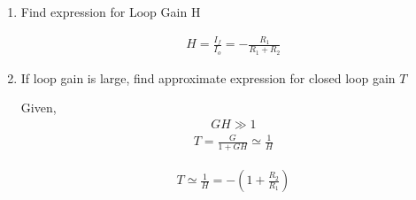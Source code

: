 \begin{enumerate}[label=\thesubsection.\arabic*.,ref=\thesubsection.\theenumi]
\begin{align}
    R_{i}=R_{s}\|R_{i d}\|(R_{1}+R_{2})
\end{align}
\begin{align}
    V_{i}=I_{i} R_{i}
\end{align}
\begin{align}
    I_{o}=-\mu V_{i} \frac{1}{1 / g_{m}+(R_{1}\|R_{2}\| r_{o 2})} \frac{r_{o 2}}{r_{o 2}+(R_{1} \| R_{2})}
\end{align}
\begin{align}
    G = \frac{I_{o}}{I_{i}}=-\mu \frac{R_{i}}{1 / g_{m}+(R_{1}\|R_{2}\| r_{o 2})} \frac{r_{o 2}}{r_{o 2}+(R_{1} \| R_{2})}
\end{align}
We use the approximation
\begin{align}
    1 / g_{m} \ll (R_{1}\|R_{2}\| r_{o 2})
\end{align}
This is because the $\frac{1}{g_{m}}$ is in order of few \ohm s but, $R_{1}$, $R_{2}$ and $r_{o2}$ are in order of k\ohm s 

\begin{align}
    G =-\mu \frac{R_{i}}{R_{1} \| R_{2}}
\end{align}
\begin{align}
    R_{o}=r_{o 2}+(R_{1} \| R_{2})+(g_{m} r_{o 2})(R_{1} \| R_{2})
\end{align}
\begin{align}
    \implies R_{o} \simeq g_{m} r_{o 2}\left(R_{1} \| R_{2}\right)
\end{align}

\item
Find expression for Loop Gain H

\solution
\begin{align}
    H = \frac{I_{f}}{I_{o}}=-\frac{R_{1}}{R_{1}+R_{2}}
\end{align}

\item
If loop gain is large, find approximate expression for closed loop gain $T$

\solution
Given,
\begin{align}
    GH \gg 1
\end{align}
\begin{align}
    T = \frac{G}{1+GH}\simeq \frac{1}{H}
\end{align}


\begin{align}
    T \simeq \frac{1}{H}=-\left(1+\frac{R_{2}}{R_{1}}\right)
\end{align}


\end{enumerate}
